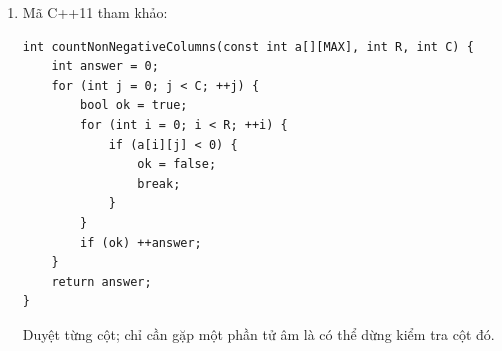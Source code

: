 \documentclass[11pt,a4paper]{article}
\begin{document}
\begin{enumerate}
\begin{minipage}[t]{\linewidth}
Dịch từ phải sang trái để không ghi đè phần tử chưa được chuyển. Chỉ tăng $n$ sau khi chèn thành công.
\end{minipage}
\item \begin{minipage}[t]{\linewidth}
Mã C++11 tham khảo:
\begin{lstlisting}
int countNonNegativeColumns(const int a[][MAX], int R, int C) {
    int answer = 0;
    for (int j = 0; j < C; ++j) {
        bool ok = true;
        for (int i = 0; i < R; ++i) {
            if (a[i][j] < 0) {
                ok = false;
                break;
            }
        }
        if (ok) ++answer;
    }
    return answer;
}
\end{lstlisting}
Duyệt từng cột; chỉ cần gặp một phần tử âm là có thể dừng kiểm tra cột đó.
\end{minipage}
\end{enumerate}
\end{document}

